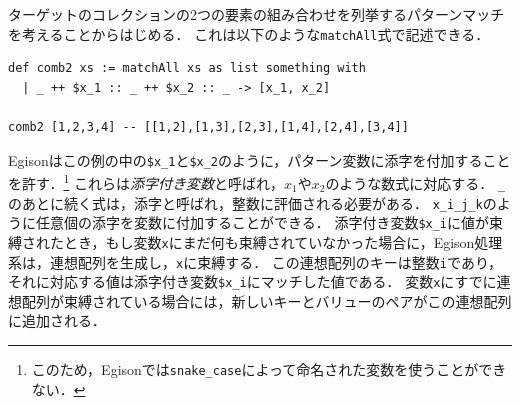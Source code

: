 ターゲットのコレクションの2つの要素の組み合わせを列挙するパターンマッチを考えることからはじめる．
これは以下のような\lstinline{matchAll}式で記述できる．
\begin{lstlisting}[language=egison,numbers=none]
def comb2 xs := matchAll xs as list something with
  | _ ++ $x_1 :: _ ++ $x_2 :: _ -> [x_1, x_2]

comb2 [1,2,3,4] -- [[1,2],[1,3],[2,3],[1,4],[2,4],[3,4]]
\end{lstlisting}
Egisonはこの例の中の\lstinline|$x_1|と\lstinline|$x_2|のように，パターン変数に添字を付加することを許す．\footnote{このため，Egisonでは\texttt{snake_case}によって命名された変数を使うことができない．}
これらは\emph{添字付き変数}と呼ばれ，$x_1$や$x_2$のような数式に対応する．
\lstinline|_|のあとに続く式は，添字と呼ばれ，整数に評価される必要がある．
\lstinline|x_i_j_k|のように任意個の添字を変数に付加することができる．
添字付き変数\lstinline|$x_i|に値が束縛されたとき，もし変数\lstinline|x|にまだ何も束縛されていなかった場合に，Egison処理系は，連想配列を生成し，\lstinline|x|に束縛する．
この連想配列のキーは整数\lstinline|i|であり，それに対応する値は添字付き変数\lstinline|$x_i|にマッチした値である．
変数\lstinline|x|にすでに連想配列が束縛されている場合には，新しいキーとバリューのペアがこの連想配列に追加される．

